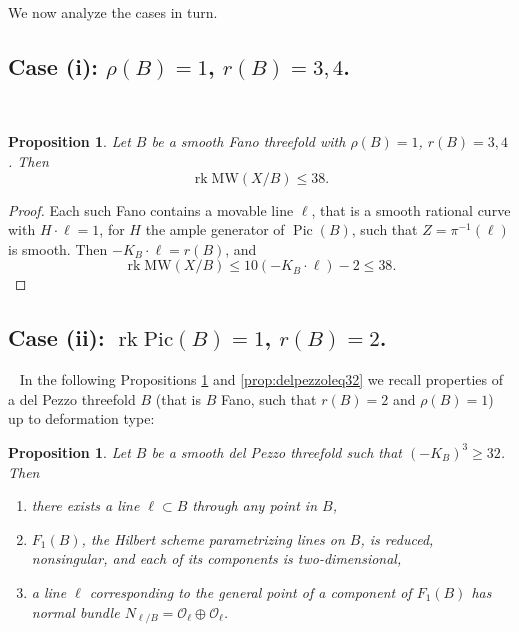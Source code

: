 \documentclass[11pt]{amsart}
\newtheorem{proposition}[theorem]{Proposition}
\theoremstyle{definition}
\theoremstyle{definition}
\theoremstyle{remark}
\theoremstyle{remark}
\theoremstyle{definition}
\theoremstyle{conjecture}
\newcommand{\MW}{\mathrm{MW}}
\newcommand{\Pic}{\mathrm{Pic}}
\begin{document}
{We now analyze the cases in turn.}\\

\vskip 0.4in
\subsection{Case (i):  
$\rho (B)=1$, $r(B)=3,4$.}~
\vskip 0.1in

\begin{proposition} Let $B$ be a smooth Fano threefold  with $\rho(B)=1$, $r(B)=3,4$. Then 
\[\operatorname{rk} \MW(X/B)  \leq   38.\]
\end{proposition}
\begin{proof}Each  such Fano contains a  movable line $\ell$, that is a smooth rational curve with $H \cdot 
\ell=1$, for $H$ the ample generator of $\operatorname{Pic}(B)$, such that $Z= \pi^{-1}(\ell)$ is smooth. Then $-K_B \cdot \ell= r(B)$, and
    \[\operatorname{rk} \MW(X/B)  \leq  10(-K_B \cdot \ell ) -2\leq 38.\] \end{proof}

\subsection{Case (ii):  
$\operatorname{rk} \Pic (B)=1$, $r(B)=2$.}~
\vskip 0.2in
 In the following Propositions \ref{prop:delpezzogeq32} and \ref{prop:delpezzoleq32} we recall properties of a del Pezzo threefold $B$ (that is $B$  Fano, such that $r(B)=2$ and $\rho(B)=1$) up to deformation type:
\begin{proposition}\label{prop:delpezzogeq32} \cite[Proposition 3.21]{Prokhorov_2025}
   Let $B$ be a smooth del Pezzo threefold %
   such that $ (-K_B)^3 \geq 32$. Then 
   \begin{enumerate}
\item there exists a line $\ell \subset B$ through any point in $B$,
\item $F_1(B)$,  the Hilbert scheme parametrizing lines on $B$, is reduced, nonsingular, and each of its components is two-dimensional,
\item a  line $\ell$  corresponding to the general point of a component of $F_1(B)$ has normal bundle $N_{\ell / B}=\mathcal O_\ell \oplus \mathcal O_\ell $.
   \end{enumerate}
\end{proposition}
\end{document}
